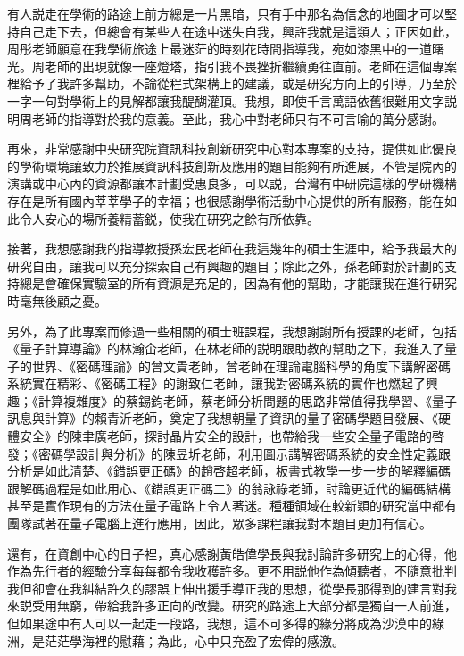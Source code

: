 有⼈説走在學術的路途上前⽅總是一片⿊暗，只有⼿中那名為信念的地圖才可以堅持⾃⼰走下去，但總會有某些⼈在途中迷失⾃我，興許我就是這類⼈；正因如此，周彤⽼師願意在我學術旅途上最迷茫的時刻花時間指導我，宛如漆⿊中的⼀道曙光。周⽼師的出現就像⼀座燈塔，指引我不畏挫折繼續勇往直前。⽼師在這個專案梩給予了我許多幫助，不論從程式架構上的建議，或是研究⽅向上的引導，乃⾄於⼀字⼀句對學術上的⾒解都讓我醍醐灌頂。我想，即使千⾔萬語依舊很難⽤⽂字説明周⽼師的指導對於我的意義。⾄此，我⼼中對⽼師只有不可⾔喻的萬分感謝。

\bigskip

再來，⾮常感謝中央研究院資訊科技創新研究中⼼對本專案的⽀持，提供如此優良的學術環境讓致⼒於推展資訊科技創新及應⽤的題⽬能夠有所進展，不管是院內的演講或中⼼內的資源都讓本計劃受惠良多，可以説，台灣有中研院這樣的學研機構存在是所有國內莘莘學⼦的幸福；也很感謝學術活動中⼼提供的所有服務，能在如此令⼈安⼼的場所養精蓄鋭，使我在研究之餘有所依靠。

\bigskip

接著，我想感謝我的指導教授孫宏⺠⽼師在我這幾年的碩⼠⽣涯中，給予我最⼤的研究⾃由，讓我可以充分探索⾃⼰有興趣的題⽬；除此之外，孫⽼師對於計劃的⽀持總是會確保實驗室的所有資源是充⾜的，因為有他的幫助，才能讓我在進⾏研究時毫無後顧之憂。

\bigskip

另外，為了此專案而修過⼀些相關的碩⼠班課程，我想謝謝所有授課的⽼師，包括《量⼦計算導論》的林瀚仚⽼師，在林⽼師的説明跟助教的幫助之下，我進⼊了量⼦的世界、《密碼理論》的曾⽂貴⽼師，曾⽼師在理論電腦科學的⻆度下講解密碼系統實在精彩、《密碼⼯程》的謝致仁⽼師，讓我對密碼系統的實作也燃起了興趣；《計算複雜度》的蔡錫鈞⽼師，蔡⽼師分析問題的思路⾮常值得我學習、《量⼦訊息與計算》的賴⻘沂⽼師，奠定了我想朝量⼦資訊的量⼦密碼學題⽬發展、《硬體安全》的陳⾀廣⽼師，探討晶⽚安全的設計，也帶給我⼀些安全量⼦電路的啓發；《密碼學設計與分析》的陳昱圻⽼師，利⽤圖⽰講解密碼系統的安全性定義跟分析是如此清楚、《錯誤更正碼》的趙啓超⽼師，板書式教學⼀步⼀步的解釋編碼跟解碼過程是如此⽤⼼、《錯誤更正碼⼆》的翁詠祿⽼師，討論更近代的編碼結構甚⾄是實作現有的⽅法在量⼦電路上令⼈著迷。種種領域在較新穎的研究當中都有團隊試著在量⼦電腦上進⾏應⽤，因此，眾多課程讓我對本題⽬更加有信⼼。

\bigskip

還有，在資創中⼼的⽇⼦裡，真⼼感謝⿈皓偉學⻑與我討論許多研究上的⼼得，他作為先⾏者的經驗分享每每都令我收穫許多。更不⽤説他作為傾聽者，不隨意批判我但卻會在我糾結許久的謬誤上伸出援⼿導正我的思想，從學⻑那得到的建⾔對我來説受⽤無窮，帶給我許多正向的改變。研究的路途上⼤部分都是獨⾃⼀⼈前進，但如果途中有⼈可以⼀起走⼀段路，我想，這不可多得的緣分將成為沙漠中的綠洲，是茫茫學海裡的慰藉；為此，⼼中只充盈了宏偉的感激。

